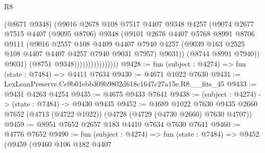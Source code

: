 \begin{lexlean}{R8}
\begin{coremodule}
                                  (@8671 @9348)
                                  (@9016
                                    @2678
                                    @108
                                    @7517
                                    @4407
                                    @9348
                                    @4257
                                    (@9074
                                      @2677
                                      @7515
                                      @4407
                                      (@9095 @8706)
                                      @9348
                                      (@9101
                                        @2676
                                        @4407
                                        @5768
                                        @8991
                                        @8706
                                        @9111
                                        (@9016
                                          @2557
                                          @108
                                          @4409
                                          @4407
                                          @7940
                                          @4257
                                          (@9039
                                            @163
                                            @2525
                                            @108
                                            @4407
                                            @4407
                                            @4257
                                            @7940
                                            @9031
                                            @7957)
                                          @9031))
                                      (@8744 @8991 @7940))
                                    @9031)
                                  (@8751 @9348))))))))))))))))
@9428 := fun (subject : @4274) => fun (state : @7484) => @4411 @7634
@9430 := @4671 @1022 @7630
@9431 := LexLeanPreserve.Ce9b01ebb309b9802d618c1647c27a15e.R8.__fits_45
@9433 := @9431 @4263 @4254
@9435 := @4675 @9433 @7641
@9438 := (subject : @4274) -> (state : @7484) -> @9430 @9435
@9452 := @4689
    @1022
    @7630
    @9435
    @2660
    @7652
    (@4713 (@4722 @1022))
    (@4728 (@4729 (@4730 @2660) @7630 @4707))
@9459 := @8951 @7652 @2657 @183 @4410 @7634 @7630 @7641
@9460 := @4776 @7652
@9490 := fun (subject : @4274) =>
  fun (state : @7484) =>
  @9452
    (@9459
      (@9460
        @106
        @182
        @4407

\end{coremodule}
\end{lexlean}
